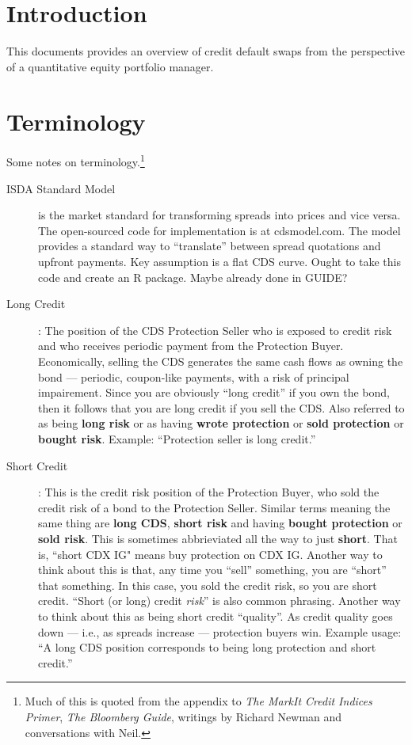 \documentclass[12pt]{article}
\begin{document}
\section*{Introduction}

This documents provides an overview of credit default swaps from the perspective of a quantitative equity portfolio manager.

\section*{Terminology}

Some notes on terminology.\footnote{Much of this is quoted from the appendix to \emph{The MarkIt Credit Indices Primer}, \emph{The Bloomberg Guide}, writings by Richard Newman and conversations with Neil.}

\begin{description}
    \item[ISDA Standard Model] is the market standard for transforming spreads into prices and vice versa. The open-sourced code for implementation is at cdsmodel.com. The model provides a standard way to ``translate'' between spread quotations and upfront payments. Key assumption is a flat CDS curve. Ought to take this code and create an R package. Maybe already done in GUIDE? 
  \item[Long Credit]: The position of the CDS Protection Seller who is exposed to credit risk and who receives periodic payment from the Protection Buyer. Economically, selling the CDS generates the same cash flows as owning the bond --- periodic, coupon-like payments, with a risk of principal impairement. Since you are obviously ``long credit'' if you own the bond, then it follows that you are long credit if you sell the CDS. Also referred to as being \textbf{long risk} or as having \textbf{wrote protection} or \textbf{sold protection} or \textbf{bought risk}. Example: ``Protection seller is long credit.'' 
  \item[Short Credit]: This is the credit risk position of the Protection Buyer, who sold the credit risk of a bond to the Protection Seller. Similar terms meaning the same thing are \textbf{long CDS}, \textbf{short risk} and having \textbf{bought protection} or \textbf{sold risk}. This is sometimes abbrieviated all the way to just \textbf{short}. That is, ``short CDX IG" means buy protection on CDX IG.  Another way to think about this is that, any time you ``sell'' something, you are ``short'' that something. In this case, you sold the credit risk, so you are short credit. ``Short (or long) credit \emph{risk}'' is also common phrasing. Another way to think about this as being short credit ``quality''. As credit quality goes down --- i.e., as spreads increase --- protection buyers win. Example usage: ``A long CDS position corresponds to being long protection and short credit.'' 

\end{description}
\end{document}
